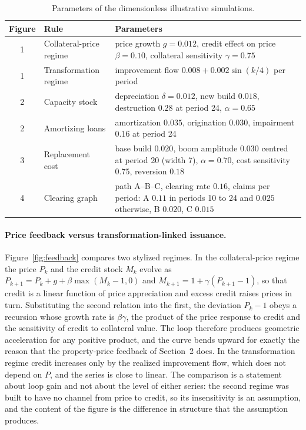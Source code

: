 \documentclass[11pt]{article}
\theoremstyle{definition}
\begin{document}
\begin{table}[htbp]
\centering
\small
\begin{tabular}{@{}c p{3.3cm} p{8.6cm}@{}}
\hline
Figure & Rule & Parameters \\
\hline
1 & Collateral-price regime & price growth $g=0.012$, credit effect on price $\beta=0.10$, collateral sensitivity $\gamma=0.75$ \\
1 & Transformation regime & improvement flow $0.008+0.002\sin(k/4)$ per period \\
2 & Capacity stock & depreciation $\delta=0.012$, new build $0.018$, destruction $0.28$ at period 24, $\alpha=0.65$ \\
2 & Amortizing loans & amortization $0.035$, origination $0.030$, impairment $0.16$ at period 24 \\
3 & Replacement cost & base build $0.020$, boom amplitude $0.030$ centred at period 20 (width 7), $\alpha=0.70$, cost sensitivity $0.75$, reversion $0.18$ \\
4 & Clearing graph & path A--B--C, clearing rate $0.16$, claims per period: A $0.11$ in periods 10 to 24 and $0.025$ otherwise, B $0.020$, C $0.015$ \\
\hline
\end{tabular}
\caption{Parameters of the dimensionless illustrative simulations.}
\label{tab:params}
\end{table}

\paragraph{Price feedback versus transformation-linked issuance.}
Figure~\ref{fig:feedback} compares two stylized regimes. In the collateral-price regime the price $P_k$ and the credit stock $M_k$ evolve as $P_{k+1}=P_k+g+\beta\max(M_k-1,0)$ and $M_{k+1}=1+\gamma(P_{k+1}-1)$, so that credit is a linear function of price appreciation and excess credit raises prices in turn. Substituting the second relation into the first, the deviation $P_k-1$ obeys a recursion whose growth rate is $\beta\gamma$, the product of the price response to credit and the sensitivity of credit to collateral value. The loop therefore produces geometric acceleration for any positive product, and the curve bends upward for exactly the reason that the property-price feedback of Section~2 does. In the transformation regime credit increases only by the realized improvement flow, which does not depend on $P$, and the series is close to linear. The comparison is a statement about loop gain and not about the level of either series: the second regime was built to have no channel from price to credit, so its insensitivity is an assumption, and the content of the figure is the difference in structure that the assumption produces.
\end{document}

